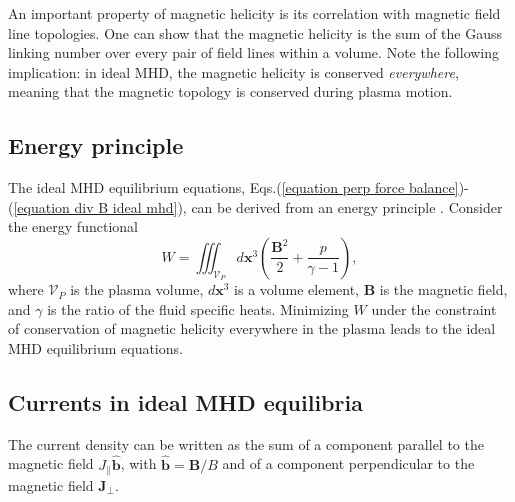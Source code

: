\documentclass[my_thesis.tex]{subfiles}
\begin{document}
An important property of magnetic helicity is its correlation with magnetic field line topologies. One can show \citep{moffattDegreeKnottednessTangled1969, arnoldTopologicalPropertiesMagnetic1998, bergerIntroductionMagneticHelicity1999} that the magnetic helicity is the sum of the Gauss linking number over every pair of field lines within a volume. Note the following implication: in ideal MHD, the magnetic helicity is conserved \emph{everywhere}, meaning that the magnetic topology is conserved during plasma motion.




\subsection{Energy principle}
The ideal MHD equilibrium equations, Eqs.(\ref{equation perp force balance})-(\ref{equation div B ideal mhd}), can be derived from an energy principle \citep{kruskalEquilibriumMagneticallyConfined1958}. Consider the energy functional 
\begin{equation}
	W = \iiint_{\mathcal{V}_P} d\mathbf{x}^3 \left(\frac{\mathbf{B}^2}{2} + \frac{p}{\gamma-1}\right), \label{eq. energy functional}
\end{equation}
where $\mathcal{V}_P$ is the plasma volume, $d\mathbf{x}^3$ is a volume element, $\mathbf{B}$ is the magnetic field, and $\gamma$ is the ratio of the fluid specific heats. Minimizing $W$ under the constraint of conservation of magnetic helicity everywhere in the plasma leads to the ideal MHD equilibrium equations. 


\subsection{Currents in ideal MHD equilibria}
The current density can be written as the sum of a component parallel to the magnetic field $J_\parallel \hat{\mathbf{b}}$, with $\hat{\mathbf{b}}=\mathbf{B}/B$ and of a component perpendicular to the magnetic field $\mathbf{J}_\perp$.
\end{document}
